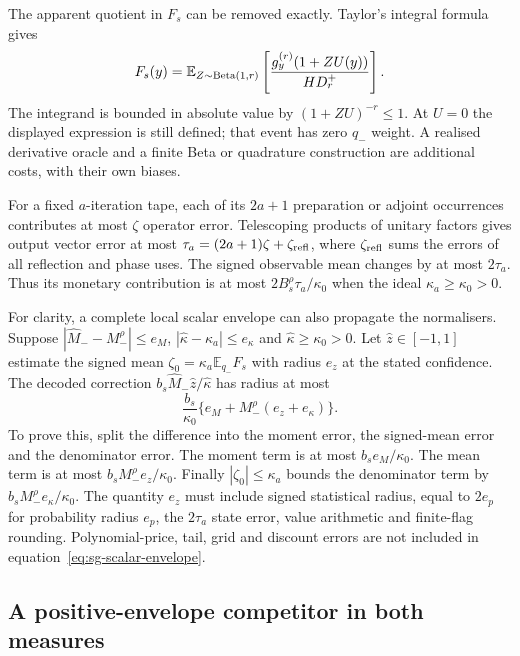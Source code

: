 The apparent quotient in $F_s$ can be removed exactly. Taylor's
integral formula gives
\[
 F_s(y)=
 \mathbb E_{Z\sim{\rm Beta}(1,r)}
       \left[\frac{g_y^{(r)}(1+ZU(y))}{H D_r^+}\right].
\]
The integrand is bounded in absolute value by $(1+ZU)^{-r}\leq1$.
At $U=0$ the displayed expression is still defined; that event has
zero $q_-$ weight. A realised derivative oracle and a finite Beta or
quadrature construction are additional costs, with their own biases.

For a fixed $a$-iteration tape, each of its $2a+1$ preparation or
adjoint occurrences contributes at most $\zeta$ operator error.
Telescoping products of unitary factors gives output vector error
at most
$\tau_a=(2a+1)\zeta+\zeta_{\rm refl}$, where
$\zeta_{\rm refl}$ sums the errors of all reflection and phase uses.
The signed observable mean changes by at most $2\tau_a$.
Thus its monetary contribution is at most
$2B_s^\rho\tau_a/\kappa_0$ when the ideal
$\kappa_a\geq\kappa_0>0$.

For clarity, a complete local scalar envelope can also propagate the
normalisers. Suppose $|\widehat M_--M_-^\rho|\leq e_M$,
$|\widehat\kappa-\kappa_a|\leq e_\kappa$ and
$\widehat\kappa\geq\kappa_0>0$. Let $\widehat z\in[-1,1]$ estimate
the signed mean $\zeta_0=\kappa_a\mathbb E_{q_-}F_s$ with radius
$e_z$ at the stated confidence. The decoded correction
$b_s\widehat M_-\widehat z/\widehat\kappa$ has radius at most
\begin{equation}
 \frac{b_s}{\kappa_0}
      \{e_M+M_-^\rho(e_z+e_\kappa)\}.
 \label{eq:sg-scalar-envelope}
\end{equation}
To prove this, split the difference into the moment error, the
signed-mean error and the denominator error. The moment term is
at most $b_se_M/\kappa_0$. The mean term is at most
$b_sM_-^\rho e_z/\kappa_0$. Finally
$|\zeta_0|\leq\kappa_a$ bounds the denominator term by
$b_sM_-^\rho e_\kappa/\kappa_0$. The quantity $e_z$ must include
signed statistical radius, equal to $2e_p$ for probability radius $e_p$,
the $2\tau_a$ state error, value arithmetic and
finite-flag rounding. Polynomial-price, tail, grid and discount errors
are not included in equation~\eqref{eq:sg-scalar-envelope}.

\subsection{A positive-envelope competitor in both measures}

